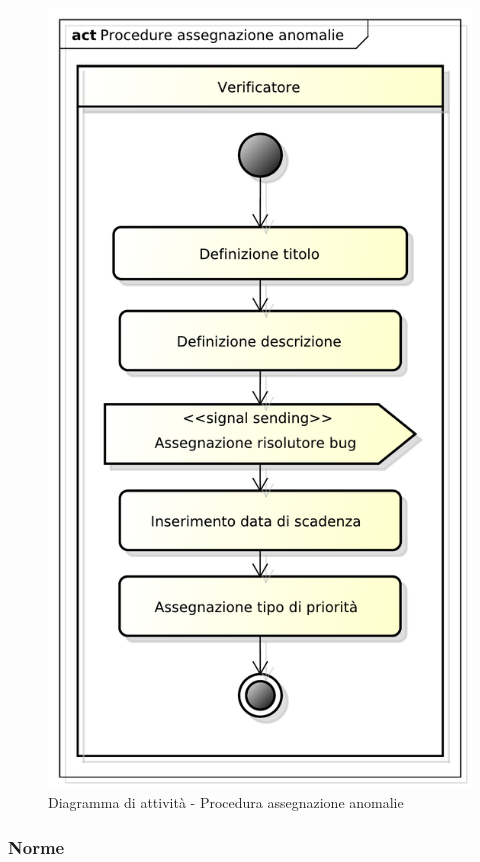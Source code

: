 			\begin{figure}[htbp]
				\centering
				\includegraphics[scale=0.4]{images/proc_assegnazione_anomalie.pdf}
				\caption{Diagramma di attività - Procedura assegnazione anomalie}
				\label{fig:procedura_assegnazione_anomalie}
			\end{figure}


		\subsubsection{Norme}
		\label{ssub:norme}
			
